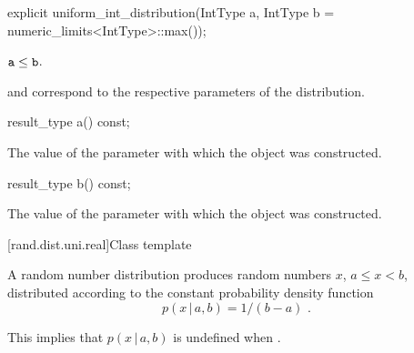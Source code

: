 %
\begin{itemdecl}
explicit uniform_int_distribution(IntType a, IntType b = numeric_limits<IntType>::max());
\end{itemdecl}

\begin{itemdescr}
\pnum
\expects
$\texttt{a} \leq \texttt{b}$.

\pnum
\remarks
  and 
 correspond to the respective parameters of the distribution.
\end{itemdescr}

%
\begin{itemdecl}
result_type a() const;
\end{itemdecl}

\begin{itemdescr}
\pnum
\returns
The value of the  parameter
 with which the object was constructed.
\end{itemdescr}

%
\begin{itemdecl}
result_type b() const;
\end{itemdecl}

\begin{itemdescr}
\pnum
\returns
The value of the  parameter
 with which the object was constructed.
\end{itemdescr}


[rand.dist.uni.real]{Class template }%
%
%

\pnum
A  random number distribution
produces random numbers $x$,
$a \leq x < b$,
distributed according to
the constant probability density function%
%
%
\[ p(x\,|\,a,b) = 1 / (b - a) \text{ .} \]
\begin{note}
This implies that $p(x\,|\,a,b)$ is undefined when .
\end{note}

